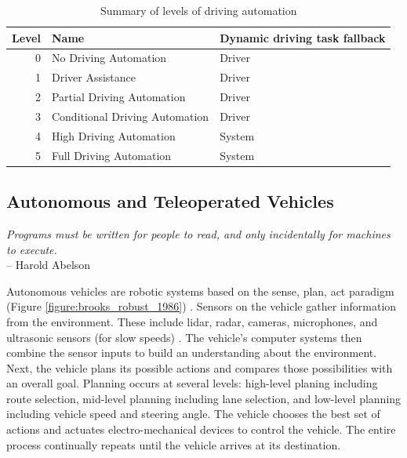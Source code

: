 \documentclass{article}
\begin{document}
\begin{table}[h]
    \begin{center}
        \begin{tabular}{r l l}
        Level & Name & Dynamic driving task fallback  \\
        \hline
        0 & No Driving Automation & Driver \\
        1 & Driver Assistance & Driver \\
        2 & Partial Driving Automation & Driver \\
        3 & Conditional Driving Automation & Driver \\
        4 & High Driving Automation & System \\
        5 & Full Driving Automation & System
        \end{tabular}
    \caption{Summary of levels of driving automation \citep{sae_international_taxonomy_2018}}
    \label{table:sae_international_taxonomy_2018}
    \end{center}
\end{table}

\subsection{Autonomous and Teleoperated Vehicles}

\begin{mdframed}
    \emph{Programs must be written for people to read, and only incidentally for machines to execute.} \\ -- Harold Abelson \citep{abelson_structure_1996}
\end{mdframed}

\noindent Autonomous vehicles are robotic systems based on the sense, plan, act paradigm (Figure \ref{figure:brooks_robust_1986}) \citep{dickmanns_seeing_1994, christensen_key_2015}. Sensors on the vehicle gather information from the environment. These include lidar, radar, cameras, microphones, and ultrasonic sensors (for slow speeds) \citep{waymo_waymo_2017}. The vehicle's computer systems then combine the sensor inputs to build an understanding about the environment. Next, the vehicle plans its possible actions and compares those possibilities with an overall goal. Planning occurs at several levels: high-level planing including route selection, mid-level planning including lane selection, and low-level planning including vehicle speed and steering angle. The vehicle chooses the best set of actions and actuates electro-mechanical devices to control the vehicle. The entire process continually repeats until the vehicle arrives at its destination.
\end{document}
